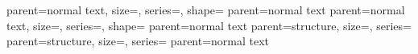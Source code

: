 


	{parent=normal text, size=\large, series=\mdseries, shape=\upshape}
	{parent=normal text}
	{parent=normal text, size=\small, series=\mdseries, shape=\itshape}
	{parent=normal text}
\ifnum {}
		{parent=structure, size=\normalsize, series=\bfseries}
\else
		{parent=structure, size=\normalsize, series=}
\fi
{}
	{parent=normal text}

\makeatletter
{}
\makeatother

\makeatletter
\renewcommand{\beamer@insttitle}[1]{\highlight{\textsuperscript{\kern.75pt \textit{#1}}}}
\renewcommand{\beamer@instinst}[1]{\beamer@insttitle{#1}\ignorespaces}
\renewcommand{\beamer@andinst}{\\[0.33\baselineskip]}
\makeatother




